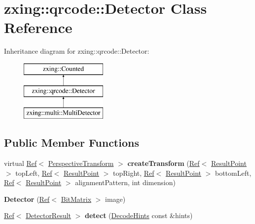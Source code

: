 \hypertarget{classzxing_1_1qrcode_1_1_detector}{}\section{zxing\+:\+:qrcode\+:\+:Detector Class Reference}
\label{classzxing_1_1qrcode_1_1_detector}
Inheritance diagram for zxing\+:\+:qrcode\+:\+:Detector\+:\begin{figure}[H]
\begin{center}
\leavevmode
\includegraphics[height=3.000000cm]{classzxing_1_1qrcode_1_1_detector}
\end{center}
\end{figure}
\subsection*{Public Member Functions}
\begin{DoxyCompactItemize}
\item 
\mbox{\label{classzxing_1_1qrcode_1_1_detector_a5c937e8ce84f88c448410ac06e98f85d}} 
virtual \mbox{\hyperlink{classzxing_1_1_ref}{Ref}}$<$ \mbox{\hyperlink{classzxing_1_1_perspective_transform}{Perspective\+Transform}} $>$ {\bfseries create\+Transform} (\mbox{\hyperlink{classzxing_1_1_ref}{Ref}}$<$ \mbox{\hyperlink{classzxing_1_1_result_point}{Result\+Point}} $>$ top\+Left, \mbox{\hyperlink{classzxing_1_1_ref}{Ref}}$<$ \mbox{\hyperlink{classzxing_1_1_result_point}{Result\+Point}} $>$ top\+Right, \mbox{\hyperlink{classzxing_1_1_ref}{Ref}}$<$ \mbox{\hyperlink{classzxing_1_1_result_point}{Result\+Point}} $>$ bottom\+Left, \mbox{\hyperlink{classzxing_1_1_ref}{Ref}}$<$ \mbox{\hyperlink{classzxing_1_1_result_point}{Result\+Point}} $>$ alignment\+Pattern, int dimension)
\item 
\mbox{\label{classzxing_1_1qrcode_1_1_detector_a7f9ae270b02b5417e29c86ef6a64dd90}} 
{\bfseries Detector} (\mbox{\hyperlink{classzxing_1_1_ref}{Ref}}$<$ \mbox{\hyperlink{classzxing_1_1_bit_matrix}{Bit\+Matrix}} $>$ image)
\item 
\mbox{\label{classzxing_1_1qrcode_1_1_detector_a8a696e0c2047f3169a515564a0006930}} 
\mbox{\hyperlink{classzxing_1_1_ref}{Ref}}$<$ \mbox{\hyperlink{classzxing_1_1_detector_result}{Detector\+Result}} $>$ {\bfseries detect} (\mbox{\hyperlink{classzxing_1_1_decode_hints}{Decode\+Hints}} const \&hints)
\end{DoxyCompactItemize}
